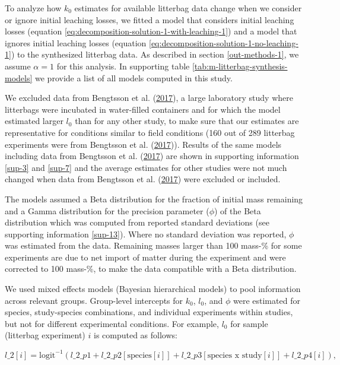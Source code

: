 \documentclass[
  12pt,
]{article}
\begin{document}
To analyze how \(k_0\) estimates for available litterbag data change when we consider or ignore initial leaching losses, we fitted a model that considers initial leaching losses (equation \eqref{eq:decomposition-solution-1-with-leaching-1}) and a model that ignores initial leaching losses (equation \eqref{eq:decomposition-solution-1-no-leaching-1}) to the synthesized litterbag data. As described in section \ref{out-methods-1}, we assume \(\alpha=1\) for this analysis. In supporting table \ref{tab:m-litterbag-synthesis-models} we provide a list of all models computed in this study.

We excluded data from Bengtsson et al. (\protect\hyperlink{ref-Bengtsson.2017}{2017}), a large laboratory study where litterbags were incubated in water-filled containers and for which the model estimated larger \(l_0\) than for any other study, to make sure that our estimates are representative for conditions similar to field conditions (160 out of 289 litterbag experiments were from Bengtsson et al. (\protect\hyperlink{ref-Bengtsson.2017}{2017})). Results of the same models including data from Bengtsson et al. (\protect\hyperlink{ref-Bengtsson.2017}{2017}) are shown in supporting information \ref{sup-3} and \ref{sup-7} and the average estimates for other studies were not much changed when data from Bengtsson et al. (\protect\hyperlink{ref-Bengtsson.2017}{2017}) were excluded or included.

The models assumed a Beta distribution for the fraction of initial mass remaining and a Gamma distribution for the precision parameter (\(\phi\)) of the Beta distribution which was computed from reported standard deviations (see supporting information \ref{sup-13}). Where no standard deviation was reported, \(\phi\) was estimated from the data. Remaining masses larger than 100 mass-\% for some experiments are due to net import of matter during the experiment and were corrected to 100 mass-\%, to make the data compatible with a Beta distribution.

We used mixed effects models (Bayesian hierarchical models) to pool information across relevant groups. Group-level intercepts for \(k_0\), \(l_0\), and \(\phi\) were estimated for species, study-species combinations, and individual experiments within studies, but not for different experimental conditions. For example, \(l_0\) for sample (litterbag experiment) \(i\) is computed as follows:

\begin{equation}
l\_2[i]  =  \text{logit}^{-1}(l\_2\_p1 + l\_2\_p2[\text{species}[i]] + l\_2\_p3[\text{species x study}[i]] + l\_2\_p4[i]),
\label{eq:leaching-hierarchical-model-l0}
\end{equation}
\end{document}
